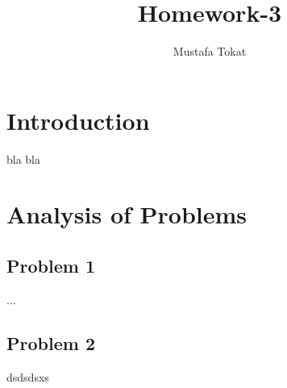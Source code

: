 \documentclass[a4paper, 11pt]{article}
\begin{document}
\title{Homework-3}
\author{Mustafa Tokat}
\maketitle
\section{Introduction}
bla bla

\section{Analysis of Problems}
\subsection{Problem 1}

...

\subsection{Problem 2}



dsdsdsxs
\end{document}
